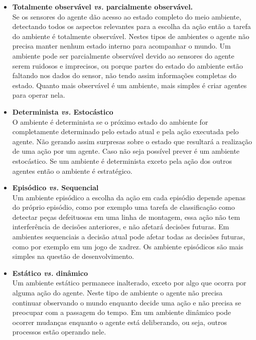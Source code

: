 \begin{itemize}
\item \textbf{Totalmente observável \textit{vs.} parcialmente observável.} \\
Se os sensores do agente dão acesso ao estado completo do meio ambiente, detectando todos os aspectos relevantes para a escolha da ação então a tarefa do ambiente é totalmente observável. Nestes tipos de ambientes o agente não precisa manter nenhum estado interno para acompanhar o mundo. Um ambiente pode ser parcialmente observável devido ao sensores do agente serem ruidosos e imprecisos, ou porque partes do estado do ambiente estão faltando nos dados do sensor, não tendo assim informações completas do estado. Quanto mais observável é um ambiente, mais simples é criar agentes para operar nela.

\item \textbf{Determinista \textit{vs.} Estocástico}\\
O ambiente é determinista se o próximo estado do ambiente for completamente determinado pelo estado atual e pela ação executada pelo agente. Não gerando assim surpresas sobre o estado que resultará a realização de uma ação por um agente. Caso não seja possível prever é um ambiente estocástico. Se um ambiente é determinista exceto pela ação dos outros agentes então o ambiente é estratégico.

\item \textbf{Episódico \textit{vs.} Sequencial} \\
Um ambiente episódico a escolha da ação em cada episódio depende apenas do próprio episódio, como por exemplo uma tarefa de classificação como detectar peças defeituosas em uma linha de montagem, essa ação não tem interferência de decisões anteriores, e não afetará decisões futuras. Em ambientes sequenciais a decisão atual pode afetar todas as decisões futuras, como por exemplo em um jogo de xadrez. Os ambiente episódicos são mais simples na questão de desenvolvimento.

\item \textbf{Estático \textit{vs.} dinâmico} \\
Um ambiente estático permanece inalterado, exceto por algo que ocorra por alguma ação do agente. Neste tipo de ambiente o agente não precisa continuar observando o mundo enquanto decide uma ação e não precisa se preocupar com a passagem do tempo. Em um ambiente dinâmico pode ocorrer mudanças enquanto o agente está deliberando, ou seja, outros processos estão operando nele.


\end{itemize}
